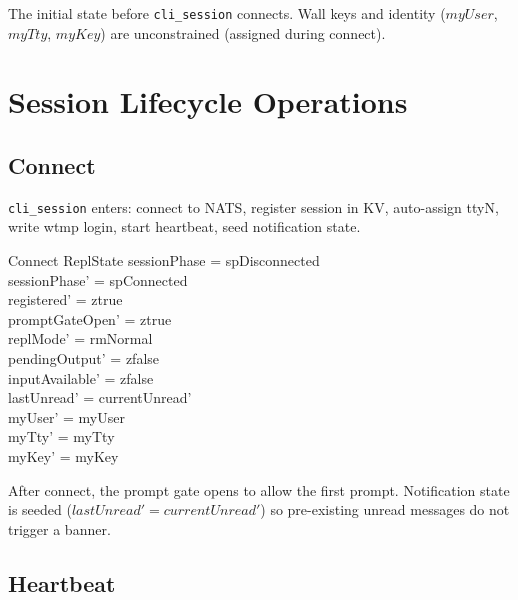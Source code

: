 \documentclass[a4paper,10pt,fleqn]{article}
\begin{document}
The initial state before \texttt{cli\_session} connects.  Wall keys
and identity ($myUser$, $myTty$, $myKey$) are unconstrained
(assigned during connect).

\section{Session Lifecycle Operations}

\subsection{Connect}

\texttt{cli\_session} enters: connect to NATS, register session in
KV, auto-assign ttyN, write wtmp login, start heartbeat, seed
notification state.

\begin{schema}{Connect}
  \Delta ReplState
\where
  sessionPhase = spDisconnected \\
  sessionPhase' = spConnected \\
  registered' = ztrue \\
  promptGateOpen' = ztrue \\
  replMode' = rmNormal \\
  pendingOutput' = zfalse \\
  inputAvailable' = zfalse \\
  lastUnread' = currentUnread' \\
  myUser' = myUser \\
  myTty' = myTty \\
  myKey' = myKey
\end{schema}

After connect, the prompt gate opens to allow the first prompt.
Notification state is seeded ($lastUnread' = currentUnread'$) so
pre-existing unread messages do not trigger a banner.

\subsection{Heartbeat}
\end{document}
